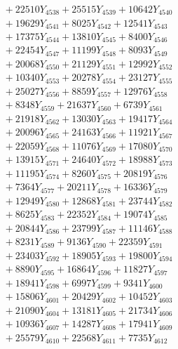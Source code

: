 \documentclass[a4paper,10pt]{article}
\begin{document}
{\begin{align}
&\;  + 22510 Y_{4538} + 25515 Y_{4539} + 10642 Y_{4540} \\[0.3ex]
&\;  + 19629 Y_{4541} + 8025 Y_{4542} + 12541 Y_{4543} \\[0.3ex]
&\;  + 17375 Y_{4544} + 13810 Y_{4545} + 8400 Y_{4546} \\[0.3ex]
&\;  + 22454 Y_{4547} + 11199 Y_{4548} + 8093 Y_{4549} \\[0.3ex]
&\;  + 20068 Y_{4550} + 21129 Y_{4551} + 12992 Y_{4552} \\[0.3ex]
&\;  + 10340 Y_{4553} + 20278 Y_{4554} + 23127 Y_{4555} \\[0.3ex]
&\;  + 25027 Y_{4556} + 8859 Y_{4557} + 12976 Y_{4558} \\[0.5ex]\allowbreak
&\;  + 8348 Y_{4559} + 21637 Y_{4560} + 6739 Y_{4561} \\[0.3ex]
&\;  + 21918 Y_{4562} + 13030 Y_{4563} + 19417 Y_{4564} \\[0.3ex]
&\;  + 20096 Y_{4565} + 24163 Y_{4566} + 11921 Y_{4567} \\[0.3ex]
&\;  + 22059 Y_{4568} + 11076 Y_{4569} + 17080 Y_{4570} \\[0.3ex]
&\;  + 13915 Y_{4571} + 24640 Y_{4572} + 18988 Y_{4573} \\[0.3ex]
&\;  + 11195 Y_{4574} + 8260 Y_{4575} + 20819 Y_{4576} \\[0.3ex]
&\;  + 7364 Y_{4577} + 20211 Y_{4578} + 16336 Y_{4579} \\[0.3ex]
&\;  + 12949 Y_{4580} + 12868 Y_{4581} + 23744 Y_{4582} \\[0.3ex]
&\;  + 8625 Y_{4583} + 22352 Y_{4584} + 19074 Y_{4585} \\[0.3ex]
&\;  + 20844 Y_{4586} + 23799 Y_{4587} + 11146 Y_{4588} \\[0.5ex]\allowbreak
&\;  + 8231 Y_{4589} + 9136 Y_{4590} + 22359 Y_{4591} \\[0.3ex]
&\;  + 23403 Y_{4592} + 18905 Y_{4593} + 19800 Y_{4594} \\[0.3ex]
&\;  + 8890 Y_{4595} + 16864 Y_{4596} + 11827 Y_{4597} \\[0.3ex]
&\;  + 18941 Y_{4598} + 6997 Y_{4599} + 9341 Y_{4600} \\[0.3ex]
&\;  + 15806 Y_{4601} + 20429 Y_{4602} + 10452 Y_{4603} \\[0.3ex]
&\;  + 21090 Y_{4604} + 13181 Y_{4605} + 21734 Y_{4606} \\[0.3ex]
&\;  + 10936 Y_{4607} + 14287 Y_{4608} + 17941 Y_{4609} \\[0.3ex]
&\;  + 25579 Y_{4610} + 22568 Y_{4611} + 7735 Y_{4612} \\[0.3ex]

\end{align}}
\end{document}

